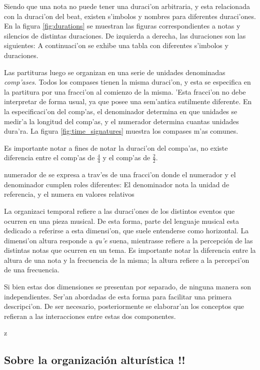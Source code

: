 Siendo que una nota no puede tener una duraci'on arbitraria, y esta relacionada con la duraci'on del beat, existen s'imbolos y nombres para diferentes duraci'ones. 
En la figura \ref{fig:durations} se muestran las figuras correspondientes a notas y silencios de distintas duraciones. De izquierda a derecha, las duraciones son las siguientes: A continuaci'on se exhibe una tabla con diferentes s'imbolos y duraciones.

\begin{imagen}
    \width{12cm}
\end{imagen}

Las partituras luego se organizan en una serie de unidades denominadas \emph{comp'ases}. Todos los compases tienen la misma duraci'on, y esta se especifica
en la partitura por una fracci'on al comienzo de la misma. 'Esta fracci'on no debe interpretar de forma usual, ya que posee una sem'antica sutilmente diferente.
En la especificaci'on del comp'as, el denominador determina en que unidades se medir'a la longitud del comp'as, y el numerador determina cuantas unidades dura'ra.
La figura \ref{fig:time_signatures} muestra los compases m'as comunes. 

\begin{imagen}
    \width{5cm}
\end{imagen}

Es importante notar a fines de notar la duraci'on del compa'as, no existe diferencia entre el comp'as de $\frac{4}{4}$ y el comp'as de $\frac{2}{2}$.

numerador de se expresa a trav'es de una fracci'on donde el numerador y el denominador 
cumplen roles diferentes: El denominador nota la unidad de referencia, y el numera en valores relativos

La organizaci
temporal refiere a las duraci'ones de los distintos eventos que ocurren en una pieza musical. De esta forma, parte del lenguaje
musical esta dedicado a referirse a esta dimensi'on, que suele entenderse como horizontal. La dimensi'on altura responde a \emph{qu'e} suena, 
mientrasse refiere a la 
percepci\'on de las distintas notas que ocurren en un tema. Es importante notar la diferencia entre la altura de una nota y la frecuencia de la misma; la altura refiere
a la percepci'on de una frecuencia.

Si bien estas dos dimensiones se presentan por separado, de ninguna manera son independientes. Ser'an abordadas de esta forma 
para facilitar una primera descripci'on. De ser necesario, posteriormente se elaborar'an los conceptos que refieran a las interacciones entre 
estas dos componentes. 


z\subsection{Sobre la organizaci\'on altur\'istica \alert{!!}}
